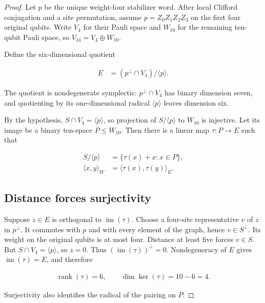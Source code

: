 \documentclass[11pt]{article}
\begin{document}
\begin{proof}
Let \(p\) be the unique weight-four stabilizer word. After local Clifford conjugation and a site permutation, assume \(p=Z_{0}Z_{1}Z_{2}Z_{3}\) on the first four original qubits. Write \(V_{4}\) for their Pauli space and \(W_{10}\) for the remaining ten-qubit Pauli space, so \(V_{14}=V_{4} \oplus W_{10}\).

Define the six-dimensional quotient

\[
\begin{aligned}
E &=(p^\perp \cap V_{4}) / \langle p \rangle.
\end{aligned}
\]

The quotient is nondegenerate symplectic: \(p^\perp \cap V_{4}\) has binary dimension seven, and quotienting by its one-dimensional radical \(\langle p \rangle\) leaves dimension six.

By the hypothesis, \(S \cap V_{4}=\langle p \rangle\), so projection of \(S/\langle p \rangle\) to \(W_{10}\) is injective. Let its image be a binary ten-space \(P \leq W_{10}\). Then there is a linear map \(\tau:P\to E\) such that

\[
\begin{aligned}
S/\langle p \rangle &=\{ \tau(x)+x : x \in P \}, \\
\langle x,y \rangle_{W} &=\langle \tau(x),\tau(y) \rangle_{E}.
\end{aligned}
\]

\subsection{Distance forces surjectivity}\label{distance-forces-surjectivity}

Suppose \(z \in E\) is orthogonal to \(\operatorname{im}(\tau)\). Choose a four-site representative \(v\) of \(z\) in \(p^\perp\). It commutes with \(p\) and with every element of the graph, hence \(v \in S^\perp\). Its weight on the original qubits is at most four. Distance at least five forces \(v \in S\). But \(S \cap V_{4}=\langle p \rangle\), so \(z=0\). Thus \((\operatorname{im}(\tau))^\perp=0\). Nondegeneracy of \(E\) gives \(\operatorname{im}(\tau)=E\), and therefore

\[
\begin{aligned}
\operatorname{rank}(\tau)=6,\qquad \dim \operatorname{ker}(\tau)=10-6=4.
\end{aligned}
\]

Surjectivity also identifies the radical of the pairing on \(P\):


\end{proof}
\end{document}
